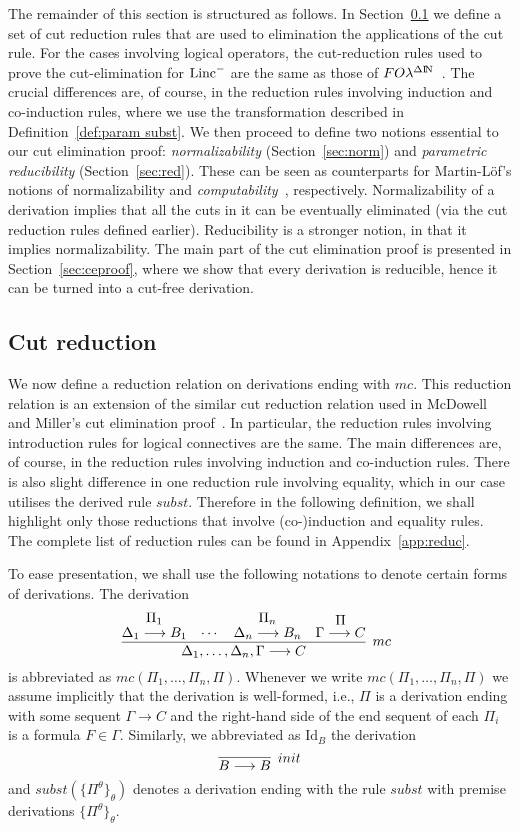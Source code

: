 \documentclass[preprint]{elsarticle}
\newcommand{\FOL   }{FO\lambda}
\newcommand{\FOLDN }{\FOL^{\Delta\N}}
\newcommand{\Linc}{{\rm Linc}^-}
\newcommand{\N}{{\rm I} \! {\rm N}}
\newcommand{\Seq}[2]{#1\longrightarrow #2}
\def\idrv{{\mathrm{Id}}}
\begin{document}
The remainder of this section is structured as follows.  In
Section~\ref{sec:reduc} we define a set of cut reduction rules that
are used to elimination the applications of the cut rule.  For the
cases involving logical operators, the cut-reduction rules used to
prove the cut-elimination for $\Linc$ are the same as those of
$\FOLDN$~\cite{mcdowell00tcs}.  The crucial differences are, of
course, in the reduction rules involving induction and co-induction
rules, where we use the transformation described in
Definition~\ref{def:param subst}.  We then proceed to define two
notions essential to our cut elimination proof: \emph{normalizability}
(Section~\ref{sec:norm}) and \emph{parametric reducibility}
(Section~\ref{sec:red}).  These can be seen as counterparts for
Martin-L\"of's notions of normalizability and
\emph{computability}~\cite{martin-lof71sls}, respectively.
Normalizability of a derivation implies that all the cuts in it can be
eventually eliminated (via the cut reduction rules defined earlier).
Reducibility is a stronger notion, in that it implies normalizability.
The main part of the cut elimination proof is presented in
Section~\ref{sec:ceproof}, where we show that every derivation is
reducible, hence it can be turned into a cut-free derivation.







\subsection{Cut reduction}
\label{sec:reduc}

We now define a reduction relation on derivations ending with $mc$.
This reduction relation is an extension of the similar cut reduction
relation used in McDowell and Miller's cut elimination
proof~\cite{mcdowell00tcs}.  In particular, the reduction rules
involving introduction rules for logical connectives are the same. The
main differences are, of course, in the reduction rules involving
induction and co-induction rules.  There is also slight difference in
one reduction rule involving equality, which in our case utilises the
derived rule $subst$.  Therefore in the following definition, we shall
highlight only those reductions that involve (co-)induction and
equality rules. The complete list of reduction rules can be found in
Appendix~\ref{app:reduc}.

To ease presentation, we shall use the following notations to
denote certain forms of derivations.  The derivation
$$
\infer[mc] {\Seq{\Delta_1, \ldots, \Delta_n, \Gamma }{C}} {
  \deduce{\Seq {\Delta_1}{B_1}}{\Pi_1} & \cdots & \deduce{\Seq
    {\Delta_n}{B_n}}{\Pi_n} & \deduce{\Seq {\Gamma}{C}}{\Pi} }
\enspace
$$
is abbreviated as $mc(\Pi_1, \ldots, \Pi_n, \Pi )$. Whenever we write
$mc(\Pi_1,\ldots,\Pi_n,\Pi)$ we assume implicitly that the derivation
is well-formed, i.e., $\Pi$ is a derivation ending with some
sequent $\Seq \Gamma C$ and the right-hand side of the end sequent of each $\Pi_i$ 
is a formula $F \in \Gamma$.
Similarly, we abbreviated as $\idrv_B$ the derivation 
$$
\infer[init]
{\Seq {B}{B}}{}
$$
and $subst(\{\Pi^\theta\}_\theta)$ denotes a derivation ending with
the rule $subst$ with premise derivations $\{\Pi^\theta\}_\theta$.
\end{document}
